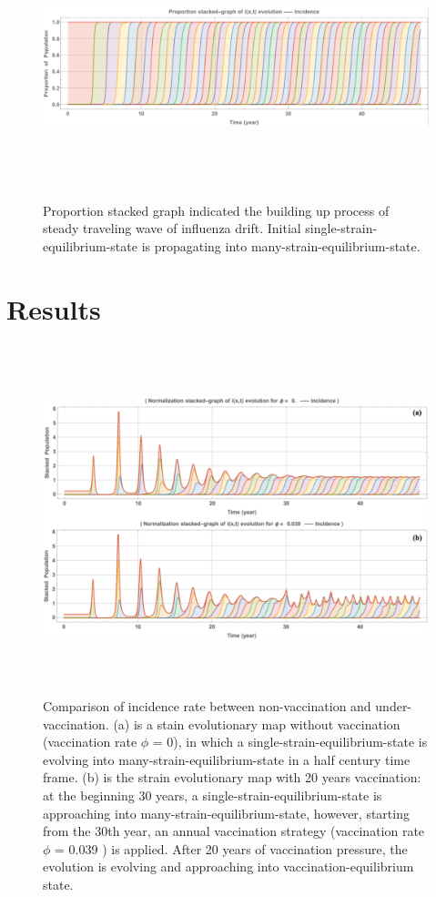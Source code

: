 \documentclass[preprint,12pt]{elsarticle}
\begin{document}
\begin{figure}
  \centering
  \includegraphics[width=6in,height=3in]{figures/Proportion}
  \caption{Proportion stacked graph indicated the building up process of steady traveling wave of influenza drift.
  Initial single-strain-equilibrium-state is propagating into many-strain-equilibrium-state.}
\label{fig:Proportion}
\end{figure}


\section{Results}

\begin{figure}
  \centering
  \includegraphics[width=6in,height=4in]{figures/UnderVaccination}
  \caption{Comparison of incidence rate between non-vaccination and under-vaccination.
  (a) is a stain evolutionary map without vaccination (vaccination rate \(\phi\) = 0), in which a single-strain-equilibrium-state is evolving into many-strain-equilibrium-state in a half century time frame. 
  (b) is the strain evolutionary map with 20 years vaccination: at the beginning 30 years, a single-strain-equilibrium-state is approaching into many-strain-equilibrium-state, however, starting from the 30th year, an annual vaccination strategy (vaccination rate \(\phi\) = 0.039 ) is applied. 
  After 20 years of vaccination pressure, the evolution is evolving and approaching into vaccination-equilibrium state.}
\label{fig:UnderVaccination}
\end{figure}
\end{document}
